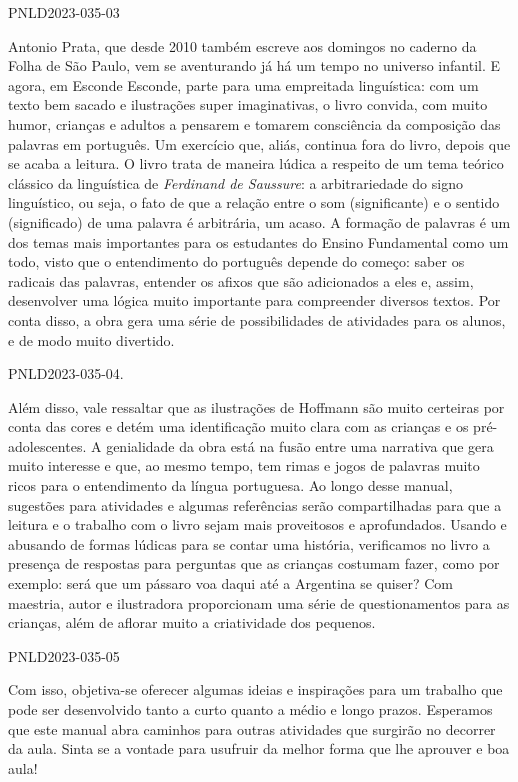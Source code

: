 \documentclass[11pt]{extarticle}
\begin{document}
PNLD2023-035-03

Antonio Prata, que desde 2010 também escreve aos domingos no caderno da Folha de São Paulo, vem se aventurando já há um tempo no universo infantil. E agora, em Esconde Esconde, parte para uma empreitada linguística: com um texto bem sacado e ilustrações super imaginativas, o livro convida, com muito humor, crianças e adultos a pensarem e tomarem consciência da composição das palavras em português. Um exercício que, aliás, continua fora do livro, depois que se acaba a leitura. O livro trata de maneira lúdica a respeito de um tema teórico clássico da linguística de \textit{Ferdinand de Saussure}: a arbitrariedade do signo linguístico, ou seja, o fato de que a relação entre o som (significante) e o sentido (significado) de uma palavra é arbitrária, um acaso. A formação de palavras é um dos temas mais importantes para os estudantes do Ensino Fundamental como um todo, visto que o entendimento do português depende do começo: saber os radicais das palavras, entender os afixos que são adicionados a eles e, assim, desenvolver uma lógica muito importante para compreender diversos textos. Por conta disso, a obra gera uma série de possibilidades de atividades para os alunos, e de modo muito divertido. 

PNLD2023-035-04.

Além disso, vale ressaltar que as ilustrações de Hoffmann são muito certeiras por conta das cores e detém uma identificação muito clara com as crianças e os pré-adolescentes. A genialidade da obra está na fusão entre uma narrativa que gera muito interesse e que, ao mesmo tempo, tem rimas e jogos de palavras muito ricos para o entendimento da língua portuguesa. Ao longo desse manual, sugestões para atividades e algumas referências serão compartilhadas para que a leitura e o trabalho com o livro sejam mais proveitosos e aprofundados. Usando e abusando de formas lúdicas para se contar uma história, verificamos no livro a presença de respostas para perguntas que as crianças costumam fazer, como por exemplo: será que um pássaro voa daqui até a Argentina se quiser? Com maestria, autor e ilustradora proporcionam uma série de questionamentos para as crianças, além de aflorar muito a criatividade dos pequenos. 

PNLD2023-035-05

Com isso, objetiva-se oferecer algumas ideias e inspirações para um trabalho que pode ser desenvolvido tanto a curto quanto a médio e longo prazos. Esperamos que este manual abra caminhos para outras atividades que surgirão no decorrer da aula. Sinta se a vontade para usufruir da melhor forma que lhe aprouver e boa aula!
\end{document}
